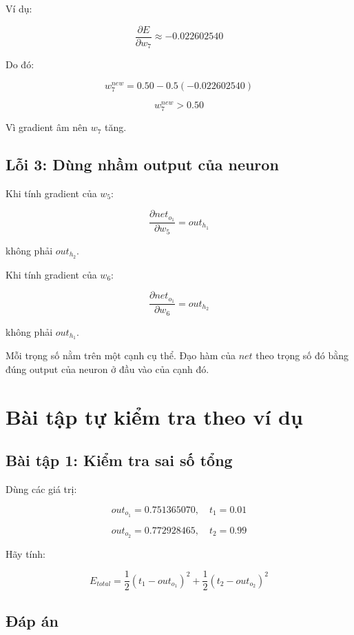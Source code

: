 Ví dụ:

\[
    \frac{\partial E}{\partial w_7}\approx -0.022602540
\]

Do đó:

\[
    w_7^{new}
    =
    0.50
    -
    0.5(-0.022602540)
\]

\[
    w_7^{new}>0.50
\]

Vì gradient âm nên $w_7$ tăng.

\subsection{Lỗi 3: Dùng nhầm output của neuron}

Khi tính gradient của $w_5$:

\[
    \frac{\partial net_{o_1}}{\partial w_5}=out_{h_1}
\]

không phải $out_{h_2}$.

Khi tính gradient của $w_6$:

\[
    \frac{\partial net_{o_1}}{\partial w_6}=out_{h_2}
\]

không phải $out_{h_1}$.

\begin{luuy}
Mỗi trọng số nằm trên một cạnh cụ thể. Đạo hàm của $net$ theo trọng số đó bằng đúng output của neuron ở đầu vào của cạnh đó.
\end{luuy}

\section{Bài tập tự kiểm tra theo ví dụ}

\subsection*{Bài tập 1: Kiểm tra sai số tổng}

Dùng các giá trị:

\[
    out_{o_1}=0.751365070,\quad t_1=0.01
\]

\[
    out_{o_2}=0.772928465,\quad t_2=0.99
\]

Hãy tính:

\[
    E_{total}
    =
    \frac{1}{2}(t_1-out_{o_1})^2
    +
    \frac{1}{2}(t_2-out_{o_2})^2
\]

\subsection*{Đáp án}

